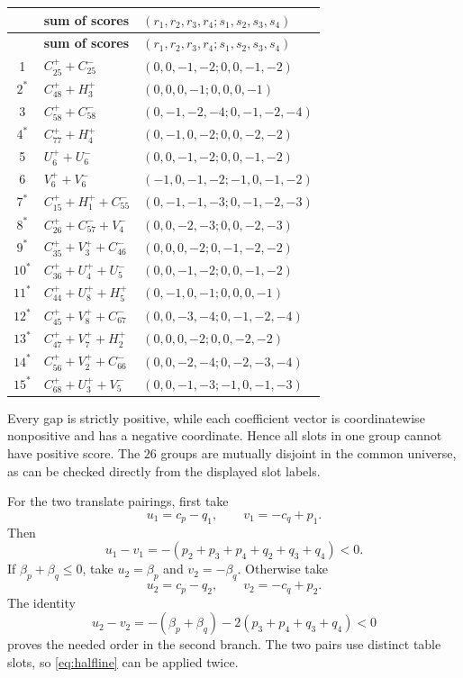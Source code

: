 \begingroup
\scriptsize
\setlength{\tabcolsep}{3.6pt}
\begin{longtable}{c>{\raggedright\arraybackslash}p{}p{}}
\toprule
&\textbf{sum of scores}&$(r_1,r_2,r_3,r_4;s_1,s_2,s_3,s_4)$\\
\midrule
\endfirsthead
\toprule
&\textbf{sum of scores}&$(r_1,r_2,r_3,r_4;s_1,s_2,s_3,s_4)$\\
\midrule
\endhead
1&$C^+_{25}+C^-_{25}$&$(0,0,-1,-2;0,0,-1,-2)$\\
$2^*$&$C^+_{48}+H^+_3$&$(0,0,0,-1;0,0,0,-1)$\\
3&$C^+_{58}+C^-_{58}$&$(0,-1,-2,-4;0,-1,-2,-4)$\\
$4^*$&$C^+_{77}+H^+_4$&$(0,-1,0,-2;0,0,-2,-2)$\\
5&$U^+_6+U^-_6$&$(0,0,-1,-2;0,0,-1,-2)$\\
6&$V^+_6+V^-_6$&$(-1,0,-1,-2;-1,0,-1,-2)$\\
$7^*$&$C^+_{15}+H^+_1+C^-_{55}$&$(0,-1,-1,-3;0,-1,-2,-3)$\\
$8^*$&$C^+_{26}+C^-_{57}+V^-_4$&$(0,0,-2,-3;0,0,-2,-3)$\\
$9^*$&$C^+_{35}+V^+_3+C^-_{46}$&$(0,0,0,-2;0,-1,-2,-2)$\\
$10^*$&$C^+_{36}+U^+_4+U^-_5$&$(0,0,-1,-2;0,0,-1,-2)$\\
$11^*$&$C^+_{44}+U^+_8+H^+_5$&$(0,-1,0,-1;0,0,0,-1)$\\
$12^*$&$C^+_{45}+V^+_8+C^-_{67}$&$(0,0,-3,-4;0,-1,-2,-4)$\\
$13^*$&$C^+_{47}+V^+_7+H^+_2$&$(0,0,0,-2;0,0,-2,-2)$\\
$14^*$&$C^+_{56}+V^+_2+C^-_{66}$&$(0,0,-2,-4;0,-2,-3,-4)$\\
$15^*$&$C^+_{68}+U^+_3+V^-_5$&$(0,0,-1,-3;-1,0,-1,-3)$\\
\bottomrule
\end{longtable}
\endgroup

Every gap is strictly positive, while each coefficient vector is
coordinatewise nonpositive and has a negative coordinate.  Hence all slots in
one group cannot have positive score.  The $26$ groups are mutually disjoint in the common universe, as can be checked directly from the displayed slot labels.

For the two translate pairings, first take
\[
 u_1=c_p-q_1,\qquad v_1=-c_q+p_1.
\]
Then
\[
 u_1-v_1=-(p_2+p_3+p_4+q_2+q_3+q_4)<0.
\]
If $\beta_p+\beta_q\leq0$, take
$u_2=\beta_p$ and $v_2=-\beta_q$.  Otherwise take
\[
 u_2=c_p-q_2,\qquad v_2=-c_q+p_2.
\]
The identity
\[
 u_2-v_2=-(\beta_p+\beta_q)-2(p_3+p_4+q_3+q_4)<0
\]
proves the needed order in the second branch.  The two pairs use distinct
table slots, so \eqref{eq:halfline} can be applied twice.

